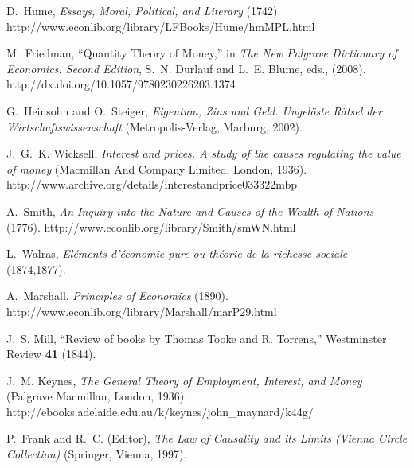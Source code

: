 \documentclass[aps,rmp,preprint,amsfonts,showpacs,showkeys]{revtex4}
\begin{document}
\begin{thebibliography}{10}
D.~Hume, {\em Essays, Moral, Political, and Literary\/} (1742).
\newline http://www.econlib.org/library/LFBooks/Hume/hmMPL.html

M.~Friedman, \enquote{Quantity Theory of Money,} in {\em The New Palgrave
  Dictionary of Economics. Second Edition\/}, S.~N. Durlauf and L.~E. Blume,
  eds.,   (2008).
\newline http://dx.doi.org/10.1057/9780230226203.1374

G.~Heinsohn and O.~Steiger, {\em {E}igentum, {Z}ins und {G}eld.
  {U}ngel{\"{o}}ste {R}{\"{a}}tsel der {W}irtschaftswissenschaft\/}
  (Metropolis-Verlag, Marburg, 2002).

J.~G.~K. Wicksell, {\em Interest and prices. {A} study of the causes regulating
  the value of money\/} (Macmillan And Company Limited, London, 1936).
\newline http://www.archive.org/details/interestandprice033322mbp

A.~Smith, {\em An Inquiry into the Nature and Causes of the Wealth of
  Nations\/} (1776).
\newline http://www.econlib.org/library/Smith/smWN.html

L.~Walras, {\em El{\'{e}}ments d'{\'{e}}conomie pure ou th{\'{e}}orie de la
  richesse sociale\/} (1874,1877).

A.~Marshall, {\em Principles of Economics\/} (1890).
\newline http://www.econlib.org/library/Marshall/marP29.html

J.~S. Mill, \enquote{Review of books by Thomas Tooke and R. Torrens,}
  Westminster Review {\bf 41} (1844).

J.~M. Keynes, {\em The General Theory of Employment, Interest, and Money\/}
  (Palgrave Macmillan, London, 1936).
\newline http://ebooks.adelaide.edu.au/k/keynes/john\_maynard/k44g/

P.~Frank and R.~C. (Editor), {\em The Law of Causality and its Limits (Vienna
  Circle Collection)\/} (Springer, Vienna, 1997).

\end{thebibliography}
\end{document}
